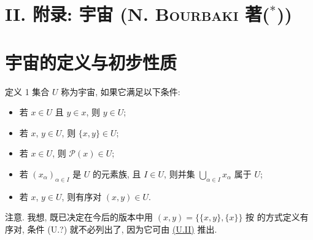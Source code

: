 

\begingroup
\makeatletter
\def\Hy@writebookmark#1#2#3#4#5{}
\makeatother
\section*{II. 附录: 宇宙 (N. \textsc{Bourbaki} 著($^*$))}\pageoriginale
\endgroup
{}

\hypersetup{bookmarksdepth=2}
\makeatletter
\let\sgaFourSavedToclevelSection\toclevel@section
\def\toclevel@section{2}
\makeatother

\setcounter{section}{0}
\section{宇宙的定义与初步性质}%
\hypertarget{sga4.exp.I.appendix.II.sec.1}{}

\hypertarget{sga4.exp.I.appendix.II.sec.1.definition.1}{}
\begin{enonce*}{定义 1}
集合 $U$ 称为宇宙, 如果它满足以下条件:
\begin{itemize}
\hypertarget{sga4.exp.I.appendix.II.sec.1.definition.1.condition.U.I}{}
\item[(U.I)] 若 $x\in U$ 且 $y\in x$, 则 $y\in U$;

\hypertarget{sga4.exp.I.appendix.II.sec.1.definition.1.condition.U.II}{}
\item[(U.II)] 若 $x$, $y\in U$, 则 $\{x,y\}\in U$;

\hypertarget{sga4.exp.I.appendix.II.sec.1.definition.1.condition.U.III}{}
\item[(U.III)] 若 $x\in U$, 则 $\mathcal{P}(x)\in U$;

\hypertarget{sga4.exp.I.appendix.II.sec.1.definition.1.condition.U.IV}{}
\item[(U.IV)] 若 $(x_{\alpha})_{\alpha\in I}$ 是 $U$ 的元素族, 且 $I\in U$, 则并集 $\bigcup_{\alpha\in I}x_{\alpha}$ 属于 $U$;

\hypertarget{sga4.exp.I.appendix.II.sec.1.definition.1.condition.U.question}{}
\item[(U.?)] 若 $x$, $y\in U$, 则有序对 $(x,y)\in U$.
\end{itemize}
\end{enonce*}
\noindent 注意. 我想, 既已决定在今后的版本中用 $(x,y)=\{\{x,y\}, \{x\}\}$ 按  的方式定义有序对, 条件 (U.?) 就不必列出了, 因为它可由 \hyperlink{sga4.exp.I.appendix.II.sec.1.definition.1.condition.U.II}{(U.II)} 推出.

